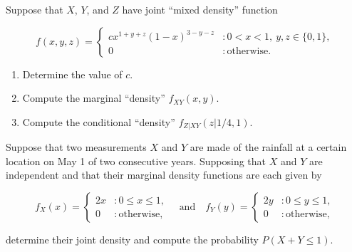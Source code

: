 \documentclass[12pt,reqno]{amsart}
\begin{document}
\bigskip
\prob Suppose that $X$, $Y$, and $Z$ have joint ``mixed density'' function

	\[f(x,y,z) = \begin{cases}
	c x^{1+y+z} ( 1-x)^{3-y-z} & : 0 < x< 1, \ y,z\in \{0,1\}, \\
	0 & : \text{otherwise}.
	\end{cases}
	\]
	
\medskip
\begin{enumerate}
\item Determine the value of $c$.\vfill



\item Compute the marginal ``density'' $f_{XY}(x,y)$.\vfill




\item Compute the conditional ``density'' $f_{Z|XY}(z|1/4, 1)$.\vfill



\end{enumerate}













\newpage
\prob Suppose that two measurements $X$ and $Y$ are made of the rainfall at a certain location on May 1 of two consecutive years. Supposing that $X$ and $Y$ are independent and that their marginal density functions are each given by

	\[f_X(x) = \begin{cases}
	2x & : 0 \leq x \leq 1, \\
	0 & : \text{otherwise},
	\end{cases} \quad \text{and} \quad
	f_Y(y) = \begin{cases}
	2y & : 0 \leq y \leq 1, \\
	0 & : \text{otherwise},
	\end{cases}
	\]

determine their joint density and compute the probability $P(X + Y \leq 1)$.\vfill


	
	
	
	
	
	
\end{document}
